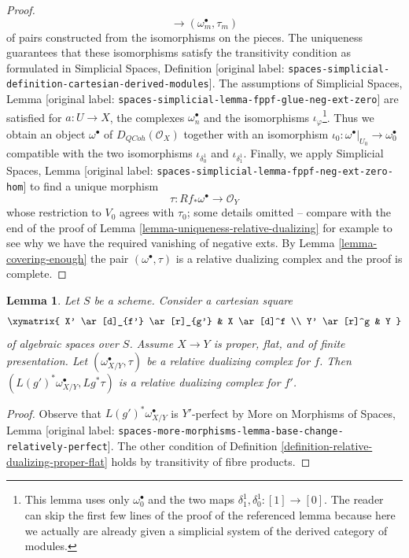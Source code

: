 \documentclass[10pt,a4paper]{article}
\theoremstyle{plain}
\newtheorem{lemma}[subsection]{Lemma}
\theoremstyle{definition}
\theoremstyle{remark}
\numberwithin{equation}{subsection}
\def\QCoh{\mathit{QCoh}}
\begin{document}
\begin{proof}
$$\longrightarrow
(\omega_m^\bullet, \tau_m)
$$
of pairs constructed from the isomorphisms on the pieces.
The uniqueness guarantees that these isomorphisms satisfy
the transitivity condition as formulated in
Simplicial Spaces, Definition
\textnormal{[original label: \nolinkurl{spaces-simplicial-definition-cartesian-derived-modules}]}.
The assumptions of Simplicial Spaces, Lemma
\textnormal{[original label: \nolinkurl{spaces-simplicial-lemma-fppf-glue-neg-ext-zero}]}
are satisfied for $a : U \to X$, the complexes $\omega_n^\bullet$
and the isomorphisms $\iota_\varphi$\footnote{This lemma uses only
$\omega_0^\bullet$ and the two maps $\delta_1^1, \delta_0^1 : [1] \to [0]$.
The reader can skip the first few lines of the proof of the
referenced lemma
because here we actually are already given a simplicial system of
the derived category of modules.}.
Thus we obtain an object $\omega^\bullet$ of $D_\QCoh(\mathcal{O}_X)$
together with an isomorphism
$\iota_0 : \omega^\bullet|_{U_0} \to \omega_0^\bullet$
compatible with the two isomorphisms
$\iota_{\delta^1_0}$ and $\iota_{\delta^1_1}$.
Finally, we apply
Simplicial Spaces, Lemma
\textnormal{[original label: \nolinkurl{spaces-simplicial-lemma-fppf-neg-ext-zero-hom}]}
to find a unique morphism
$$
\tau : Rf_*\omega^\bullet \longrightarrow \mathcal{O}_Y
$$
whose restriction to $V_0$ agrees with $\tau_0$; some details omitted --
compare with the end of the  proof of
Lemma \ref{lemma-uniqueness-relative-dualizing}
for example to see why we have
the required vanishing of negative exts.
By Lemma \ref{lemma-covering-enough}
the pair $(\omega^\bullet, \tau)$ is a relative dualizing complex
and the proof is complete.
\end{proof}

\begin{lemma}
\label{lemma-base-change-relative-dualizing}
Let $S$ be a scheme. Consider a cartesian square
$$
\xymatrix{
X' \ar[d]_{f'} \ar[r]_{g'} & X \ar[d]^f \\
Y' \ar[r]^g & Y
}
$$
of algebraic spaces over $S$. Assume $X \to Y$ is proper, flat, and
of finite presentation. Let $(\omega_{X/Y}^\bullet, \tau)$ be a
relative dualizing complex for $f$. Then
$(L(g')^*\omega_{X/Y}^\bullet, Lg^*\tau)$ is a relative dualizing
complex for $f'$.
\end{lemma}

\begin{proof}
Observe that $L(g')^*\omega_{X/Y}^\bullet$ is $Y'$-perfect by
More on Morphisms of Spaces, Lemma
\textnormal{[original label: \nolinkurl{spaces-more-morphisms-lemma-base-change-relatively-perfect}]}.
The other condition of
Definition \ref{definition-relative-dualizing-proper-flat}
holds by transitivity of fibre products.
\end{proof}
\end{document}
